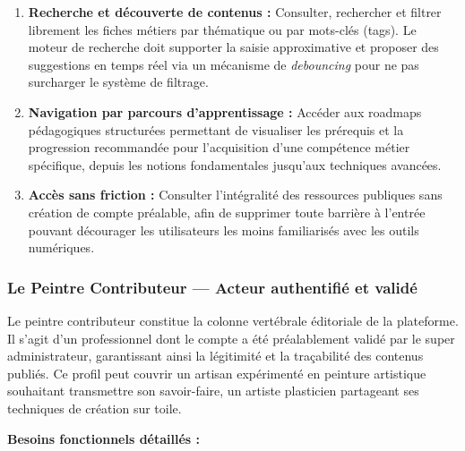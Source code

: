 \documentclass[12pt,a4paper]{report}
\begin{document}
\begin{enumerate}[leftmargin=1.5cm, label=\textbf{BF-\arabic*.}, itemsep=5pt]
    \item \textbf{Recherche et découverte de contenus :} Consulter, rechercher et filtrer librement les fiches métiers par thématique ou par mots-clés (tags). Le moteur de recherche doit supporter la saisie approximative et proposer des suggestions en temps réel via un mécanisme de \textit{debouncing} pour ne pas surcharger le système de filtrage.
    \item \textbf{Navigation par parcours d'apprentissage :} Accéder aux roadmaps pédagogiques structurées permettant de visualiser les prérequis et la progression recommandée pour l'acquisition d'une compétence métier spécifique, depuis les notions fondamentales jusqu'aux techniques avancées.
    \item \textbf{Accès sans friction :} Consulter l'intégralité des ressources publiques sans création de compte préalable, afin de supprimer toute barrière à l'entrée pouvant décourager les utilisateurs les moins familiarisés avec les outils numériques.
\end{enumerate}

\subsubsection*{Le Peintre Contributeur — Acteur authentifié et validé}

\noindent
Le peintre contributeur constitue la colonne vertébrale éditoriale de la plateforme. Il s'agit d'un professionnel dont le compte a été préalablement validé par le super administrateur, garantissant ainsi la légitimité et la traçabilité des contenus publiés. Ce profil peut couvrir un artisan expérimenté en peinture artistique souhaitant transmettre son savoir-faire, un artiste plasticien partageant ses techniques de création sur toile.

\vspace{0.5em}
\textbf{Besoins fonctionnels détaillés :}
\end{document}
